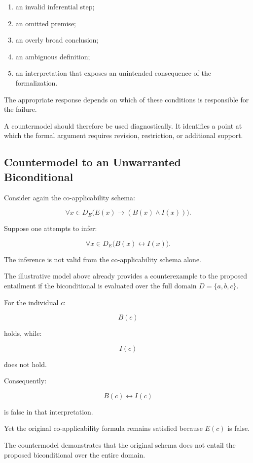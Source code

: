 \begin{enumerate}
    \item an invalid inferential step;
    \item an omitted premise;
    \item an overly broad conclusion;
    \item an ambiguous definition;
    \item an interpretation that exposes an unintended
    consequence of the formalization.
\end{enumerate}

The appropriate response depends on which of these
conditions is responsible for the failure.

A countermodel should therefore be used diagnostically.
It identifies a point at which the formal argument
requires revision, restriction, or additional support.

\subsection{Countermodel to an Unwarranted Biconditional}

Consider again the co-applicability schema:

\[
    \forall x \in D_E
    \bigl(
        E(x) \rightarrow (B(x) \land I(x))
    \bigr).
\]

Suppose one attempts to infer:

\[
    \forall x \in D_E
    \bigl(
        B(x) \leftrightarrow I(x)
    \bigr).
\]

The inference is not valid from the co-applicability
schema alone.

The illustrative model above already provides a
counterexample to the proposed entailment if the
biconditional is evaluated over the full domain
\(D=\{a,b,c\}\).

For the individual \(c\):

\[
    B(c)
\]

holds, while:

\[
    I(c)
\]

does not hold.

Consequently:

\[
    B(c) \leftrightarrow I(c)
\]

is false in that interpretation.

Yet the original co-applicability formula remains
satisfied because \(E(c)\) is false.

The countermodel demonstrates that the original
schema does not entail the proposed biconditional
over the entire domain.

